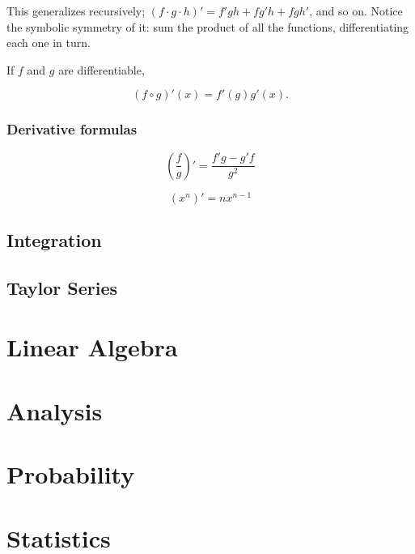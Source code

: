 \documentclass{article}
\begin{document}
This generalizes recursively; $(f \cdot g \cdot h)' = f'gh + fg'h + fgh'$, and
so on. Notice the symbolic symmetry of it: sum the product of all the functions,
differentiating each one in turn.

\begin{theorem}

If $f$ and $g$ are differentiable,

\begin{equation}
(f \circ g)'(x) = f'(g)g'(x).
\end{equation}


\end{theorem}

\subsubsection{Derivative formulas}

\begin{equation}
\left(\frac{f}{g}\right)' = \frac{f'g - g'f}{g^2}
\end{equation}

\begin{equation}
(x^n)' = nx^{n-1}
\end{equation}

\subsection{Integration}

\subsection{Taylor Series}

\section{Linear Algebra}

\section{Analysis}

\section{Probability}

\section{Statistics}
\end{document}
